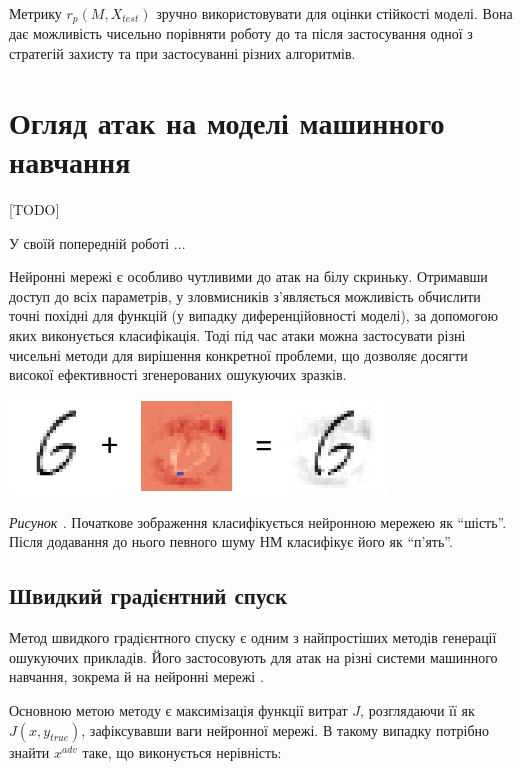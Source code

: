 \documentclass[14pt,a4paper]{extarticle}
\newcounter{e}
\newcounter{pic}
\newcommand{\pic}[1]{\refstepcounter{pic} \vspace{-0.3cm}\textit{Рисунок \arabic{pic}\label{#1}.}}
\numberwithin{equation}{section}
\numberwithin{figure}{section}
\begin{document}
 Метрику $r_p(M, X_{test})$ зручно використовувати для оцінки стійкості моделі. Вона дає можливість чисельно порівняти роботу до та після застосування одної з стратегій захисту та при застосуванні різних алгоритмів. 
 
 \newpage
 \thispagestyle{empty}
 \section{Огляд атак на моделі машинного навчання}
 
 [TODO]

 У своїй попередній роботі ...


 Нейронні мережі є особливо чутливими до атак на білу скриньку. Отримавши доступ до всіх параметрів, у зловмисників з'являється можливість обчислити точні похідні для функцій (у випадку диференційовності моделі), за допомогою яких виконується класифікація. Тоді під час атаки можна застосувати різні чисельні методи для вирішення конкретної проблеми, що дозволяє досягти високої ефективності згенерованих ошукуючих зразків.

 \begin{center}
	\includegraphics[width=10cm]{../images/six.png}
 \end{center}
 \begin{center}
	\pic{six}
	Початкове зображення класифікується нейронною мережею як ``шість''. Після додавання до нього певного шуму НМ класифікує його як ``п'ять''.
 \end{center}

 \subsection{Швидкий градієнтний спуск}

 Метод швидкого градієнтного спуску є одним з найпростіших методів генерації ошукуючих прикладів. Його застосовують для атак на різні системи машинного навчання, зокрема й на нейронні мережі \cite{explaining-a-e}.

 Основною метою методу є максимізація функції витрат $J$, розглядаючи її як $J(x, y_{true})$, зафіксувавши ваги нейронної мережі. В такому випадку потрібно знайти $x^{adv}$ таке, що виконується нерівність: 
\end{document}
